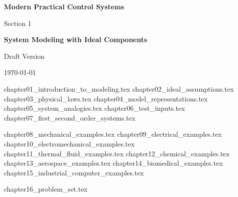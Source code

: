 \documentclass[11pt,letterpaper,openany]{book}
\begin{document}
\begin{titlepage}
\centering
\vspace*{3cm}

{\Huge\bfseries\color{chaptercolor} Modern Practical Control Systems \par}
\vspace{1cm}
{\Large Section 1 \par}
\vspace{0.5cm}
{\LARGE\bfseries System Modeling with Ideal Components \par}

\vspace{3cm}

{\Large \authorname \par}
\vspace{0.3cm}
{\large \authordepartment \par}
{\large \authorinstitution \par}

\vfill

{\large Draft Version \par}
{\large \today \par}
\end{titlepage}

\tableofcontents

{chapter01_introduction_to_modeling.tex}
{chapter02_ideal_assumptions.tex}
{chapter03_physical_laws.tex}
{chapter04_model_representations.tex}
{chapter05_system_analogies.tex}
{chapter06_test_inputs.tex}
{chapter07_first_second_order_systems.tex}

{chapter08_mechanical_examples.tex}
{chapter09_electrical_examples.tex}
{chapter10_electromechanical_examples.tex}
{chapter11_thermal_fluid_examples.tex}
{chapter12_chemical_examples.tex}
{chapter13_aerospace_examples.tex}
{chapter14_biomedical_examples.tex}
{chapter15_industrial_computer_examples.tex}

{chapter16_problem_set.tex}
\end{document}
